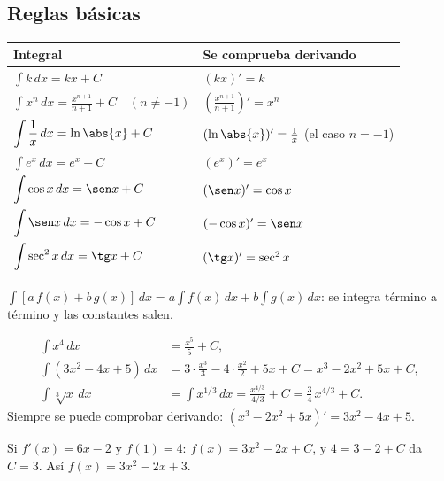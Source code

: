 \documentclass[11pt,a4paper]{article}
\newcommand{\dx}{\,dx}
\begin{document}
\subsection{Reglas básicas}
\begin{center}
\begin{tabularx}{\linewidth}{@{}>{\raggedright\arraybackslash}p{62mm} L@{}}
\toprule
Integral & Se comprueba derivando\\ \midrule
$\displaystyle\int k\dx=kx+C$ & $(kx)'=k$\\
$\displaystyle\int x^{n}\dx=\frac{x^{n+1}}{n+1}+C\quad(n\neq-1)$ & $\left(\frac{x^{n+1}}{n+1}\right)'=x^{n}$\\
$\displaystyle\int \frac1x\dx=\ln\abs{x}+C$ & $(\ln\abs{x})'=\frac1x$ (el caso $n=-1$)\\
$\displaystyle\int e^{x}\dx=e^{x}+C$ & $(e^x)'=e^x$\\
$\displaystyle\int \cos x\dx=\sen x+C$ & $(\sen x)'=\cos x$\\
$\displaystyle\int \sen x\dx=-\cos x+C$ & $(-\cos x)'=\sen x$\\
$\displaystyle\int \sec^{2}x\dx=\tg x+C$ & $(\tg x)'=\sec^2x$\\
\bottomrule
\end{tabularx}
\end{center}
\begin{propiedad}[Linealidad]
$\displaystyle\int\left[a\,f(x)+b\,g(x)\right]\dx=a\int f(x)\dx+b\int g(x)\dx$: se integra término a término y las
constantes salen.
\end{propiedad}
\clearpage
\begin{ejemplo}
\begin{align*}
\int x^{4}\dx&=\frac{x^{5}}{5}+C,\\
\int\left(3x^{2}-4x+5\right)\dx&=3\cdot\frac{x^{3}}{3}-4\cdot\frac{x^{2}}{2}+5x+C=x^{3}-2x^{2}+5x+C,\\
\int\sqrt[3]{x}\dx&=\int x^{1/3}\dx=\frac{x^{4/3}}{4/3}+C=\tfrac34\,x^{4/3}+C.
\end{align*}
Siempre se puede comprobar derivando: $\left(x^3-2x^2+5x\right)'=3x^2-4x+5$.
\end{ejemplo}
\begin{ejemplo}
Si $f'(x)=6x-2$ y $f(1)=4$: $f(x)=3x^{2}-2x+C$, y $4=3-2+C$ da $C=3$. Así $f(x)=3x^{2}-2x+3$.
\end{ejemplo}
\end{document}
